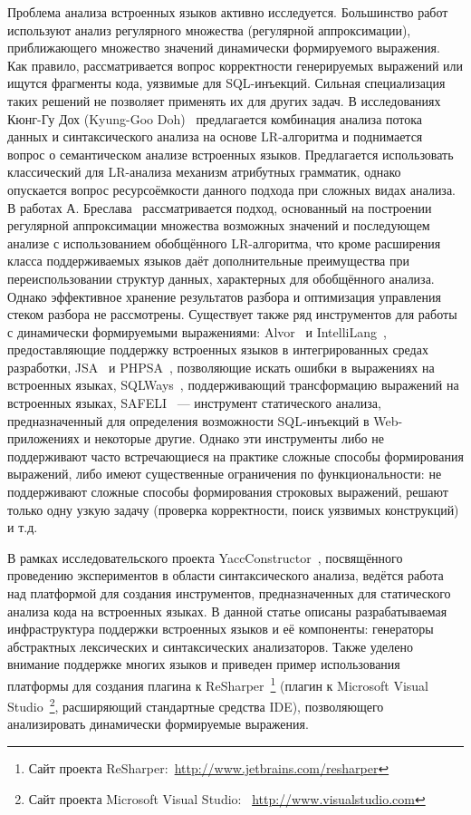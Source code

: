 Проблема анализа встроенных языков активно исследуется. Большинство работ используют анализ регулярного множества (регулярной аппроксимации), приближающего множество значений динамически формируемого выражения. Как правило,  рассматривается вопрос корректности генерируемых выражений или ищутся фрагменты кода, уязвимые для SQL-инъекций. Сильная специализация таких решений не позволяет применять их для других задач. В исследованиях Кюнг-Гу Дох (Kyung-Goo Doh)~\cite{LrAbstract1,LrAbstract2,LRAbstractParsingSema} предлагается комбинация анализа потока данных и синтаксического анализа на основе LR-алгоритма и поднимается вопрос о семантическом анализе встроенных языков. Предлагается использовать классический для LR-анализа механизм атрибутных грамматик, однако опускается вопрос ресурсоёмкости данного подхода при сложных видах анализа. В работах А. Бреслава~\cite{Alvor1,Alvor2} рассматривается подход, основанный на построении регулярной аппроксимации множества возможных значений и последующем анализе с использованием обобщённого LR-алгоритма, что кроме расширения класса поддерживаемых языков даёт дополнительные преимущества при переиспользовании структур данных, характерных для обобщённого анализа. Однако эффективное хранение результатов разбора и оптимизация управления стеком разбора не рассмотрены. Существует также ряд инструментов для работы с динамически формируемыми выражениями: Alvor~\cite{AlvorUrl} и IntelliLang~\cite{IntelliLang}, предоставляющие поддержку встроенных языков в интегрированных средах разработки, JSA~\cite{JSA} и PHPSA~\cite{PHPSA}, позволяющие искать ошибки в выражениях на встроенных языках, SQLWays~\cite{SQLWays}, поддерживающий трансформацию выражений на встроенных языках, SAFELI~\cite{SAFELI} --- инструмент статического анализа, предназначенный для определения возможности SQL-инъекций в Web-приложениях и некоторые другие. Однако эти инструменты либо не поддерживают часто встречающиеся на практике сложные способы формирования выражений, либо имеют существенные ограничения по функциональности: не поддерживают сложные способы формирования строковых выражений, решают только одну узкую задачу (проверка корректности, поиск уязвимых конструкций) и т.д. 

В рамках исследовательского проекта YaccConstructor~\cite{YCArticle}, посвящённого проведению экспериментов в области синтаксического анализа, ведётся работа над платформой для создания инструментов, предназначенных для статического анализа кода на встроенных языках. В данной статье описаны разрабатываемая инфраструктура поддержки встроенных языков и её компоненты: генераторы абстрактных лексических и синтаксических анализаторов. Также уделено внимание поддержке многих языков и приведен пример использования платформы для создания плагина к ReSharper~\footnote{Сайт проекта ReSharper:~\url{http://www.jetbrains.com/resharper}} (плагин к Microsoft Visual Studio~\footnote{Сайт проекта Microsoft Visual Studio: ~\url{http://www.visualstudio.com}}, расширяющий стандартные средства IDE), позволяющего анализировать динамически формируемые выражения.


